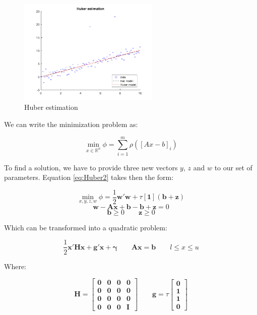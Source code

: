 \begin{figure}[htb]
\centering
\includegraphics[width=0.6\textwidth]{../img/Huber}
\caption{Huber estimation}
\label{fig:HuberEstimation}
\end{figure} 

We can write the minimization problem  as:

\begin{equation}
\min\limits_{x \in \mathbb{R}^n} \phi = \sum_{i = 1}^m \rho ([A x - b]_i)
\label{eq:Huber2}
\end{equation}

To find a solution, we have to provide three new vectors $y$, $z$ and $w$ to our set of parameters. Equation \ref{eq:Huber2} takes then the form:


\begin{equation}
\min\limits_{x, y, z, w} \phi = \frac{1}{2} \mathbf{w}' \mathbf{w} + \tau [\mathbf{1}] (\mathbf{b} + \mathbf{z})
\label{eq:Huber3}
\end{equation}
\[
\mathbf{w} - \mathbf{A x} + \mathbf{b} - \mathbf{b} + \mathbf{z} = 0
\]
\[
\mathbf{b} \geq 0 \qquad \mathbf{z} \geq  0
\]

Which can be transformed into a quadratic problem:

\begin{equation}
\frac{1}{2} \mathbf{x' H x} + \mathbf{g' x} + \mathbf{\gamma} \qquad \mathbf{Ax} = \mathbf{b} \qquad l \leq x \leq u
\label{eq:Huber4}
\end{equation}

Where:

\[
\mathbf{H} =
\begin{bmatrix}
\mathbf{0} & \mathbf{0} & \mathbf{0} & \mathbf{0}\\
\mathbf{0} & \mathbf{0} & \mathbf{0} & \mathbf{0} \\
\mathbf{0} & \mathbf{0} & \mathbf{0} & \mathbf{0} \\
\mathbf{0} & \mathbf{0} & \mathbf{0} & \mathbf{I}
\end{bmatrix}
\qquad
\mathbf{g} = \tau
\begin{bmatrix}
\mathbf{0}\\
\mathbf{1}\\
\mathbf{1}\\
\mathbf{0}
\end{bmatrix}
\]

